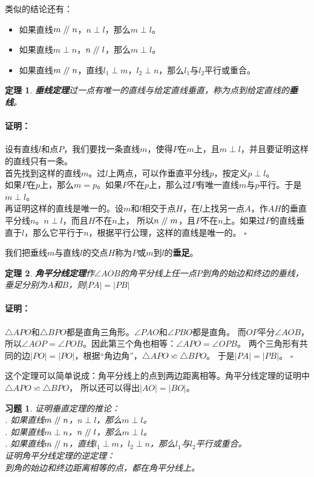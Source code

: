\documentclass[12pt,UTF8]{ctexbook}
\newtheorem{tm}{定理}[section]
\newenvironment{proof2}{\paragraph{\textbf{证明：}}}{\hfill$\square$}
\newtheorem{xt}{习题}[section]
\renewcommand\parallel{\mathrel{/\mskip-4mu/}}
\begin{document}
类似的结论还有：
\begin{itemize}
    \item 如果直线$m \parallel n$，$n \perp l$，那么$m \perp l$。
    \item 如果直线$m \perp n$，$n \parallel l$，那么$m \perp l$。
    \item 如果直线$m \parallel n$，直线$l_1 \perp m$，$l_2 \perp n$，那么$l_1$与$l_2$平行或重合。
\end{itemize}
\begin{tm}{\textbf{垂线定理}}\label{tm:3-1-1}
    过一点有唯一的直线与给定直线垂直，称为点到给定直线的\textbf{垂线}。
\end{tm}
\begin{proof2}
    设有直线$l$和点$P$，我们要找一条直线$m$，使得$P$在$m$上，且$m\perp l$，并且要证明这样的直线只有一条。\\
    首先找到这样的直线$m$。过$l$上两点，可以作垂直平分线$p$，按定义$p \perp l$。\\
    如果$P$在$p$上，那么$m=p$。如果$P$不在$p$上，那么过$P$有唯一直线$m$与$p$平行。于是$m\perp l$。\\
    再证明这样的直线是唯一的。设$m$和$l$相交于点$H$，在$l$上找另一点$A$，作$AH$的垂直平分线$n$。$n\perp l$，而且$H$不在$n$上，
    所以$n \parallel m$，且$P$不在$n$上。如果过$P$的直线垂直于$l$，那么它平行于$n$，根据平行公理，这样的直线是唯一的。
\end{proof2}

我们把垂线$m$与直线$l$的交点$H$称为$P$或$m$到$l$的\textbf{垂足}。

\begin{tm}{\textbf{角平分线定理}}\label{tm:3-1-20}
    作$\angle AOB$的角平分线上任一点$P$到角的始边和终边的垂线，垂足分别为$A$和$B$，则$|PA| = |PB|$
\end{tm}
\begin{proof2}
    $\triangle APO$和$\triangle BPO$都是直角三角形。$\angle PAO$和$\angle PBO$都是直角。
    而$OP$平分$\angle AOB$，所以$\angle AOP = \angle POB$。因此第三个角也相等：$\angle APO = \angle OPB$。
    两个三角形有共同的边$|PO| = |PO|$，根据“角边角”，$\triangle APO \backsimeq \triangle BPO$。
    于是$|PA| = |PB|$。
\end{proof2}

这个定理可以简单说成：角平分线上的点到两边距离相等。角平分线定理的证明中$\triangle APO \backsimeq \triangle BPO$，
所以还可以得出$|AO| = |BO|$。

\begin{xt}
    证明垂直定理的推论：\\
    . 如果直线$m \parallel n$，$n \perp l$，那么$m \perp l$。\\
    . 如果直线$m \perp n$，$n \parallel l$，那么$m \perp l$。\\
    . 如果直线$m \parallel n$，直线$l_1 \perp m$，$l_2 \perp n$，那么$l_1$与$l_2$平行或重合。\\
    证明角平分线定理的逆定理：\\
    \indent 到角的始边和终边距离相等的点，都在角平分线上。
\end{xt}
\end{document}
